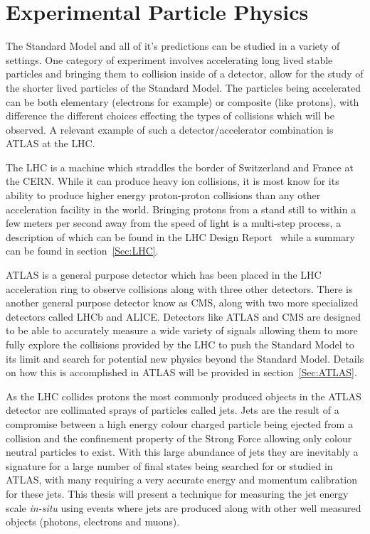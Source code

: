 \section{Experimental Particle Physics}
\label{Sec:Experi}
The Standard Model and all of it's predictions can be studied in a variety of settings.  
One category of experiment involves accelerating long lived stable particles and bringing them to collision inside of a detector, allow for the study of the shorter lived particles of the Standard Model.  
The particles being accelerated can be both elementary (electrons for example) or composite (like protons), with difference the different choices effecting the types of collisions which will be observed.  
A relevant example of such a detector/accelerator combination is \gls{ATLAS} at the \gls{LHC}.  

The \gls{LHC} is a machine which straddles the border of Switzerland and France at the \gls{CERN}.  
While it can produce heavy ion collisions, it is most know for its ability to produce higher energy proton-proton collisions than any other acceleration facility in the world.   
Bringing protons from a stand still to within a few meters per second away from the speed of light is a multi-step process, a description of which can be found in the LHC Design Report~\cite{LHCDesignReport} while a summary can be found in section~\ref{Sec:LHC}.  

\gls{ATLAS} is a general purpose detector which has been placed in the LHC acceleration ring to observe collisions along with three other detectors.  
There is another general purpose detector know as \gls{CMS}, along with two more specialized detectors called \gls{LHCb} and \gls{ALICE}.  
Detectors like \gls{ATLAS} and \gls{CMS} are designed to be able to accurately measure a wide variety of signals allowing them to more fully explore the collisions provided by the \gls{LHC} to push the Standard Model to its limit and search for potential new physics beyond the Standard Model.  
Details on how this is accomplished in ATLAS will be provided in section~\ref{Sec:ATLAS}.  

As the \gls{LHC} collides protons the most commonly produced objects in the \gls{ATLAS} detector are collimated sprays of particles called jets.  
Jets are the result of a compromise between a high energy colour charged particle being ejected from a collision and the confinement property of the Strong Force allowing only colour neutral particles to exist.  
With this large abundance of jets they are inevitably a signature for a large number of final states being searched for or studied in ATLAS, with many requiring a very accurate energy and momentum calibration for these jets.  
This thesis will present a technique for measuring the jet energy scale \textit{in-situ} using events where jets are produced along with other well measured objects (photons, electrons and muons).  

